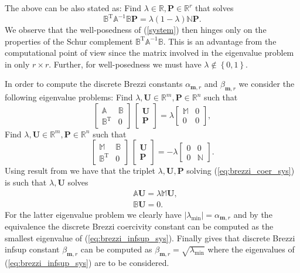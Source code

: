 \documentclass[a4paper,10pt]{article}
\newcommand{\R}{\ensuremath{\mathbb{R}}}
\newcommand{\mm}{\ensuremath{\mathbf{m}}}
\newcommand{\Amat}{\ensuremath{\mathbb{A}}}
\newcommand{\Bmat}{\ensuremath{\mathbb{B}}}
\newcommand{\Bmatt}{\ensuremath{\mathbb{B}^{\text{T}}}}
\newcommand{\Mmat}{\ensuremath{\mathbb{M}}}
\newcommand{\Nmat}{\ensuremath{\mathbb{N}}}
\newcommand{\Uvec}{\ensuremath{\mathbf{U}}}
\newcommand{\Pvec}{\ensuremath{\mathbf{P}}}
\begin{document}
  The above can be also stated as: Find $\lambda\in\R, \Pvec\in\R^r$ that solves
  \[
    \Bmatt\Amat^{-1}\Bmat\Pvec=\lambda\left(1-\lambda\right)\Nmat\Pvec.
  \]
  We observe that the well-posedness of (\ref{system}) then hinges only on the
  properties of the Schur complement $\Bmatt\Amat^{-1}\Bmat$. This is an
  advantage from the computational point of view since the matrix involved in 
  the eigenvalue problem in only $r\times r$. Further, for well-posedness we
  must have $\lambda\notin\left\{0, 1\right\}$.

  In order to compute the discrete Brezzi constants $\alpha_{\mm, r}$ and
  $\beta_{\mm, r}$ we consider the following eigenvalue problems: Find
  $\lambda, \Uvec\in\R^m, \Pvec\in\R^n$ such that
  \begin{equation}
    \label{eq:brezzi_coer_sys}
    \begin{bmatrix}
      \mathbb{A} & \mathbb{B} \\
      \mathbb{B}^{\text{T}} & 0
    \end{bmatrix}
    \,
    \begin{bmatrix}
      \mathbf{U} \\
      \mathbf{P}
    \end{bmatrix}
    =
    \lambda
    \begin{bmatrix}
      \Mmat & 0\\
      0 & 0
    \end{bmatrix},
  \end{equation}
  Find $\lambda, \Uvec\in\R^m, \Pvec\in\R^n$ such that
  \begin{equation}
    \label{eq:brezzi_infsup_sys}
    \begin{bmatrix}
      \Mmat & \mathbb{B} \\
      \mathbb{B}^{\text{T}} & 0
    \end{bmatrix}
    \,
    \begin{bmatrix}
      \mathbf{U} \\
      \mathbf{P}
    \end{bmatrix}
    =
    -\lambda
    \begin{bmatrix}
      0 & 0\\
      0 & \Nmat
    \end{bmatrix}.
  \end{equation}
  Using result from \cite{rognes} we have that the triplet $\lambda, \Uvec,
  \Pvec$ solving (\ref{eq:brezzi_coer_sys}) is such that $\lambda, \Uvec$ solves
  \[
    \begin{aligned}
      &\Amat\Uvec = \lambda\Mmat\Uvec,\\
      &\Bmat\Uvec = 0.
    \end{aligned}
  \]
  For the latter eigenvalue problem we clearly have 
  $\left|\lambda_{\text{min}}\right|=\alpha_{\mm, r}$ and by the equivalence
  the discrete Brezzi coercivity constant can be computed as the smallest
  eigenvalue of (\ref{eq:brezzi_infsup_sys}). Finally \cite{qin} gives that
  discrete Brezzi infsup constant $\beta_{\mm, r}$ can be computed as
  $\beta_{\mm, r}=\sqrt{\lambda_\text{min}}$ where the eigenvalues of
  (\ref{eq:brezzi_infsup_sys}) are to be considered.
\end{document}
